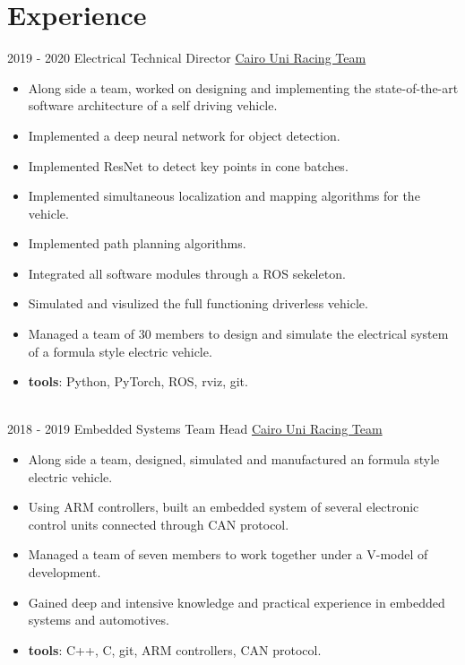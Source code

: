 \documentclass[letterpaper]{twentysecondcv} %
\begin{document}
\makeprofile %



\section{Experience}{\faAlignJustify}

\begin{twenty} %


\twentyitem
    	{2019 - 2020}
		{}
        {Electrical Technical Director}
        {\href{https://curt-fs.team//}{Cairo Uni Racing Team}}
        {}
        {\vspace{-2mm}\begin{itemize}[topsep=0pt,partopsep=0pt]
				\item Along side a team, worked on designing and implementing the state-of-the-art software architecture of a self driving vehicle.
				\item Implemented a deep neural network for object detection.
				\item Implemented ResNet to detect key points in cone batches.
				\item Implemented simultaneous localization and mapping algorithms for the vehicle.
				\item Implemented path planning algorithms.
				\item Integrated all software modules through a ROS sekeleton. 
				\item Simulated and visulized the full functioning driverless vehicle.
				\item Managed a team of 30 members to design and simulate the electrical system of a formula style electric vehicle.
				\item \textbf{tools}: Python, PyTorch, ROS, rviz, git.
				\end{itemize}} \\
				
	\twentyitem
    	{2018 - 2019}
		{}
        {Embedded Systems Team Head}
        {\href{https://curt-fs.team//}{Cairo Uni Racing Team}}
        {}
        {\vspace{-2mm}\begin{itemize}[topsep=0pt,partopsep=0pt]
        \item Along side a team, designed, simulated and manufactured an formula style electric vehicle.
        \item Using ARM controllers, built an embedded system of several electronic control units connected through CAN protocol. 
        \item Managed a team of seven members to work together under a V-model of development.
        \item Gained deep and intensive knowledge and practical experience in embedded systems and automotives.
				\item \textbf{tools}: C++, C, git, ARM controllers, CAN protocol.
    \end{itemize}} \\
		

\end{twenty}
\end{document}
